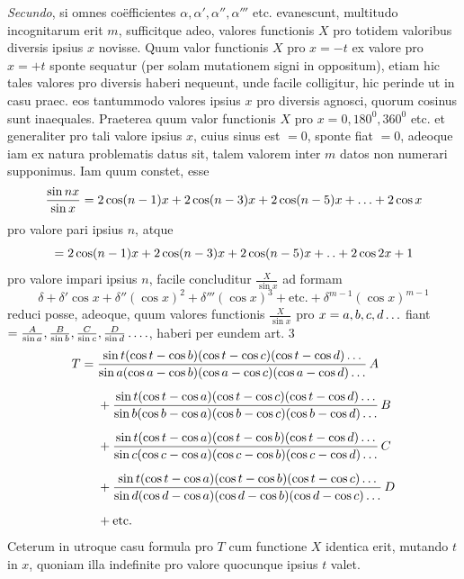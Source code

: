 \textit{Secundo}, si omnes coëfficientes \(\alpha,\alpha',\alpha'',\alpha'''\) etc. evanescunt, multitudo incognitarum erit \(m\), sufficitque adeo, valores functionis \(X\) pro totidem valoribus
diversis ipsius \(x\) novisse. Quum valor functionis \(X\) pro \(x=-t\) ex valore pro
\(x=+t\) sponte sequatur (per solam mutationem signi in oppositum), etiam hic
tales valores pro diversis haberi nequeunt, unde facile colligitur, hic perinde ut
in casu praec. eos tantummodo valores ipsius \(x\) pro diversis agnosci, quorum cosinus sunt inaequales. Praeterea quum valor functionis \(X\) pro \(x=0,180^0,360^0\)
etc. et generaliter pro tali valore ipsius \(x\), cuius sinus est \(=0\), sponte fiat \(=0\),
adeoque iam ex natura problematis datus sit, talem valorem inter \(m\) datos non
numerari supponimus. Iam quum constet, esse
\[
\frac{\sin nx}{\sin x}=2\cos(n-1)x+2\cos(n-3)x+2\cos(n-5)x+\mathinner{.\,.\,.}+2\cos x
\]
pro valore pari ipsius \(n\), atque
\[
=2\cos(n-1)x+2\cos(n-3)x+2\cos(n-5)x+\mathinner{.\,.}+2\cos 2x+1
\]
pro valore impari ipsius \(n\), facile concluditur \(\frac{X}{\sin x}\) ad formam
\[
\delta+\delta'\cos x+\delta''(\cos x)^2+\delta'''(\cos x)^3+\text{etc.}+\delta^{m-1}(\cos x)^{m-1}
\]
reduci posse, adeoque, quum valores functionis \(\frac{X}{\sin x}\) pro \(x=a,b,c,d\mathinner{.\,.\,.}\) fiant
\(=\frac{A}{\sin a},\frac{B}{\sin b},\frac{C}{\sin c},\frac{D}{\sin d}\mathinner{.\,.\,.\,.}\), haberi per eundem art. 3
\[
\begin{aligned}
T={}&\frac{\sin t(\cos t-\cos b)(\cos t-\cos c)(\cos t-\cos d)\mathinner{.\,.\,.}}{\sin a(\cos a-\cos b)(\cos a-\cos c)(\cos a-\cos d)\mathinner{.\,.\,.}}\,A\\[5pt]
&+\frac{\sin t(\cos t-\cos a)(\cos t-\cos c)(\cos t-\cos d)\mathinner{.\,.\,.}}{\sin b(\cos b-\cos a)(\cos b-\cos c)(\cos b-\cos d)\mathinner{.\,.\,.}}\,B\\[5pt]
&+\frac{\sin t(\cos t-\cos a)(\cos t-\cos b)(\cos t-\cos d)\mathinner{.\,.\,.}}{\sin c(\cos c-\cos a)(\cos c-\cos b)(\cos c-\cos d)\mathinner{.\,.\,.}}\,C\\[5pt]
&+\frac{\sin t(\cos t-\cos a)(\cos t-\cos b)(\cos t-\cos c)\mathinner{.\,.\,.}}{\sin d(\cos d-\cos a)(\cos d-\cos b)(\cos d-\cos c)\mathinner{.\,.\,.}}\,D\\[5pt]
&+\text{etc.}
\end{aligned}
\]
Ceterum in utroque casu formula pro \(T\) cum functione \(X\) identica erit, mutando
\(t\) in \(x\), quoniam illa indefinite pro valore quocunque ipsius \(t\) valet.

